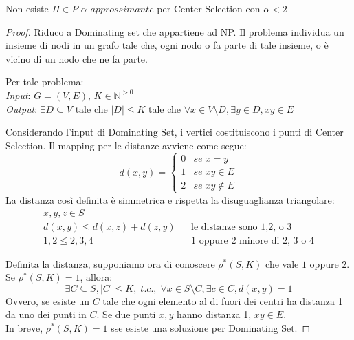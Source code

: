 \begin{theorem}
    Non esiste $\Pi \in P$ $\alpha \textit{-approssimante}$  per Center Selection con $\alpha < 2$
\end{theorem}
\begin{proof}
    Riduco a Dominating set che appartiene ad NP. Il problema 
    individua un insieme di nodi in un grafo tale che, ogni nodo
    o fa parte di tale insieme, o è vicino di un nodo che ne fa parte.

    Per tale problema:\\
    \emph{Input}: $G=(V,E)$, $K \in \mathbb{N}^{>0}$\\
    \emph{Output}: $\exists D \subseteq V $ tale che $|D| \leq K$
    tale che $\forall x \in V\setminus D, \exists y \in D, xy \in E$

    Considerando l'input di Dominating Set, i vertici costituiscono i punti 
    di Center Selection.
    Il mapping per le distanze avviene come segue:\\
    \[ 
        d(x,y) = 
        \begin{cases}
        0 & \mathit{se}\;x=y \\
        1 & \mathit{se}\;xy \in E \\
        2 & \mathit{se}\;xy \notin E
     \end{cases}
    \]
    La distanza così definita è simmetrica e rispetta la disuguaglianza triangolare:
    \begin{equation}
        \begin{aligned}
            x, y, z \in S\\
            d(x,y) \leq d(x,z) + d(z,y) && \text{le distanze sono 1,2, o 3}\\
            1,2 \leq 2,3,4  && \text{1 oppure 2 minore di 2, 3 o 4}
        \end{aligned}
    \end{equation}

    Definita la distanza, supponiamo ora di conoscere $\rho^*(S,K)$ che vale $1$ oppure $2$.
    Se $\rho^*(S,K) = 1$, allora:
            $$\exists C \subseteq S, |C| \leq K,\;t.c.,\; 
            \forall x \in S\setminus C, \exists c \in C, d(x,y) = 1$$
    Ovvero, se esiste un $C$ tale che ogni elemento al di fuori dei centri ha distanza 
    1 da uno dei punti in $C$. Se due punti $x,y$ hanno distanza 
    1, $xy \in E$.\\
    In breve, $\rho^*(S,K) = 1$ sse esiste una soluzione per Dominating Set.


\end{proof}
